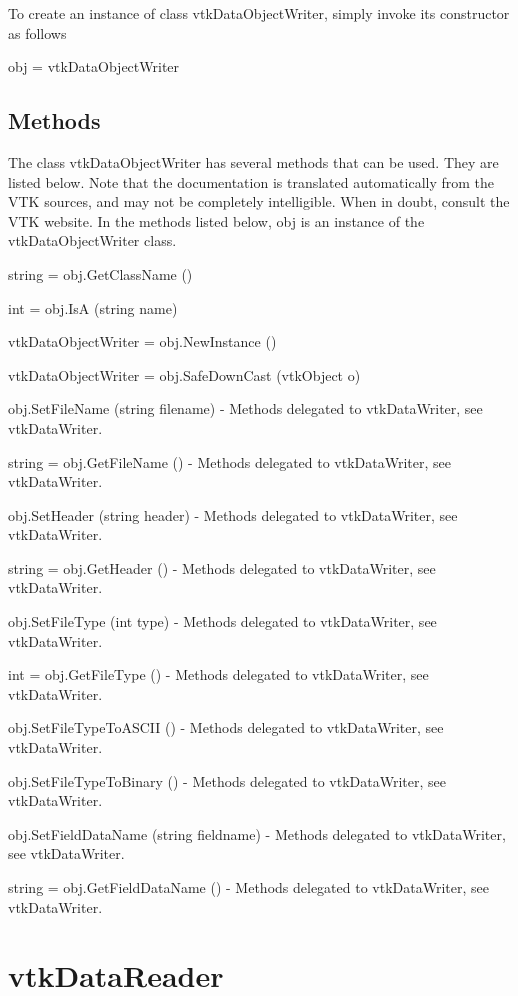 To create an instance of class vtk\-Data\-Object\-Writer, simply invoke its constructor as follows \begin{DoxyVerb}  obj = vtkDataObjectWriter
\end{DoxyVerb}
 \hypertarget{vtkwidgets_vtkxyplotwidget_Methods}{}\subsection{Methods}\label{vtkwidgets_vtkxyplotwidget_Methods}
The class vtk\-Data\-Object\-Writer has several methods that can be used. They are listed below. Note that the documentation is translated automatically from the V\-T\-K sources, and may not be completely intelligible. When in doubt, consult the V\-T\-K website. In the methods listed below, {\ttfamily obj} is an instance of the vtk\-Data\-Object\-Writer class. 
\begin{DoxyItemize}
\item {\ttfamily string = obj.\-Get\-Class\-Name ()}  
\item {\ttfamily int = obj.\-Is\-A (string name)}  
\item {\ttfamily vtk\-Data\-Object\-Writer = obj.\-New\-Instance ()}  
\item {\ttfamily vtk\-Data\-Object\-Writer = obj.\-Safe\-Down\-Cast (vtk\-Object o)}  
\item {\ttfamily obj.\-Set\-File\-Name (string filename)} -\/ Methods delegated to vtk\-Data\-Writer, see vtk\-Data\-Writer.  
\item {\ttfamily string = obj.\-Get\-File\-Name ()} -\/ Methods delegated to vtk\-Data\-Writer, see vtk\-Data\-Writer.  
\item {\ttfamily obj.\-Set\-Header (string header)} -\/ Methods delegated to vtk\-Data\-Writer, see vtk\-Data\-Writer.  
\item {\ttfamily string = obj.\-Get\-Header ()} -\/ Methods delegated to vtk\-Data\-Writer, see vtk\-Data\-Writer.  
\item {\ttfamily obj.\-Set\-File\-Type (int type)} -\/ Methods delegated to vtk\-Data\-Writer, see vtk\-Data\-Writer.  
\item {\ttfamily int = obj.\-Get\-File\-Type ()} -\/ Methods delegated to vtk\-Data\-Writer, see vtk\-Data\-Writer.  
\item {\ttfamily obj.\-Set\-File\-Type\-To\-A\-S\-C\-I\-I ()} -\/ Methods delegated to vtk\-Data\-Writer, see vtk\-Data\-Writer.  
\item {\ttfamily obj.\-Set\-File\-Type\-To\-Binary ()} -\/ Methods delegated to vtk\-Data\-Writer, see vtk\-Data\-Writer.  
\item {\ttfamily obj.\-Set\-Field\-Data\-Name (string fieldname)} -\/ Methods delegated to vtk\-Data\-Writer, see vtk\-Data\-Writer.  
\item {\ttfamily string = obj.\-Get\-Field\-Data\-Name ()} -\/ Methods delegated to vtk\-Data\-Writer, see vtk\-Data\-Writer.  
\end{DoxyItemize}\hypertarget{vtkio_vtkdatareader}{}\section{vtk\-Data\-Reader}\label{vtkio_vtkdatareader}
